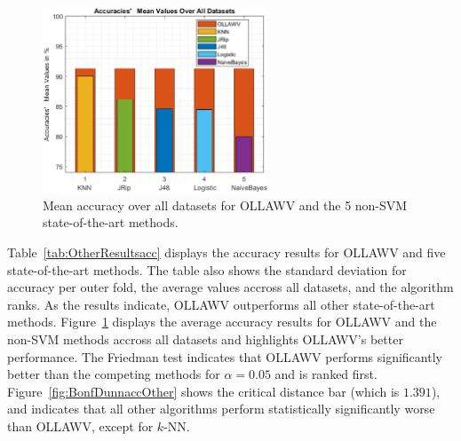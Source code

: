 \documentclass[reqno]{vcuthesis}
\numberwithin{equation}{chapter}
\begin{document}
\begin{table}[t!]
\begin{minipage}{0.9\textwidth}
{}
\captionsetup{width=\linewidth}
\label{fig:BonfDunnaccOther}
\end{minipage}
\end{table}

\begin{figure}
\centering
\includegraphics[width=0.6\textwidth]{figures/others.eps}
\caption{\small Mean accuracy over all datasets for OLLAWV and the 5 non-SVM state-of-the-art methods.}
\label{fig:accother}
\end{figure}
Table~\ref{tab:OtherResultsacc} displays the accuracy results for OLLAWV and five state-of-the-art methods. The table also shows the standard deviation for accuracy per outer fold, the average values accross all datasets, and the algorithm ranks. As the results indicate, OLLAWV outperforms all other state-of-the-art methods. Figure~\ref{fig:accother} displays the average accuracy results for OLLAWV and the non-SVM methods accross all datasets and highlights OLLAWV's better performance. The Friedman test indicates that OLLAWV performs significantly better than the competing methods for $\alpha = 0.05$ and is ranked first. Figure~\ref{fig:BonfDunnaccOther} shows the critical distance bar (which is $1.391$), and indicates that all other algorithms perform statistically significantly worse than OLLAWV, except for $k$-NN. 
\end{document}
